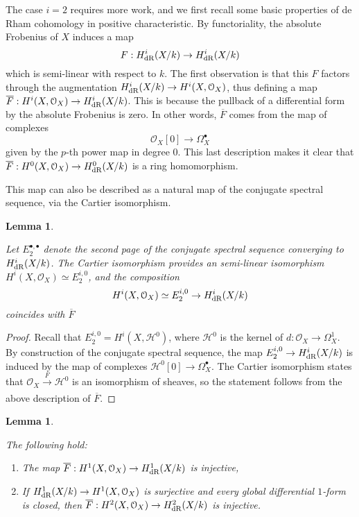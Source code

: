 \documentclass[11pt]{article}
\theoremstyle{plain}
\newtheorem{Lem}[Thm]{Lemma}
\theoremstyle{definition}
\theoremstyle{remark}
\numberwithin{equation}{section}
\newenvironment{lemma}[1]%
    { \begin{Lem} \label{L:#1}}%
    { \end{Lem} }
\newcommand{\lem}[1]{\begin{lemma}{#1} \sl}
\newcommand{\elem}{\end{lemma}}
\newcommand{\prf}{ \begin{proof} }
\newcommand{\epr}{ \end{proof} }
\newcommand\calO{\mathcal{O}}
\newcommand\xto[2]{\xrightarrow[#1]{#2}}
\newcommand\HdR[1]{H^{#1}_{\textnormal{dR}}}                             %
\begin{document}
The case $i=2$ requires more work, and we first recall some basic properties of de Rham cohomology in positive characteristic. By functoriality, the absolute Frobenius of $X$ induces a map
\[
F:\HdR{i}(X/k)\to\HdR{i}(X/k)
\]
which is semi-linear with respect to $k$. The first observation is that this $F$ factors through the augmentation $\HdR{i}(X/k)\to H^{i}(X,\calO_X)$, thus defining a map $\overline{F}:H^{i}(X,\calO_X)\to\HdR{i}(X/k)$. This is because the pullback of a differential form by the absolute Frobenius is zero. In other words, $\overline{F}$ comes from the map of complexes
\[
\calO_X[0]\to\Omega^{\bullet}_{X}
\]
given by the $p$-th power map in degree $0$. This last description makes it clear that $\overline{F}:H^0(X,\calO_X)\to\HdR{0}(X/k)$ is a ring homomorphism.

This map can also be described as a natural map of the conjugate spectral sequence, via the Cartier isomorphism. 

\lem{bordoconiugata}

Let $E_2^{\bullet,\bullet}$ denote the second page of the conjugate spectral sequence converging to $\HdR{i}(X/k)$. The Cartier isomorphism provides an semi-linear isomorphism $H^i(X,\calO_X)\simeq E_2^{i,0}$, and the composition
\begin{equation}\label{ultimaeq}
H^i(X,\calO_X)\simeq E_2^{i,0}\to\HdR{i}(X/k)
\end{equation}
coincides with $\overline{F}$
\elem

\prf

Recall that $E^{i,0}_2=H^i(X,\mathcal{H}^0)$, where $\mathcal{H}^0$ is the kernel of $d:\calO_X\to\Omega^1_X$. By construction of the conjugate spectral sequence, the map $E^{i,0}_2\to\HdR{i}(X/k)$ is induced by the map of complexes $\mathcal{H}^0[0]\to\Omega^{\bullet}_{X}$. The Cartier isomorphism states that $\calO_X\xto{}{F}\mathcal{H}^0$ is an isomorphism of sheaves, so the statement follows from the above description of $\overline{F}$. \epr
\lem{comportamentofbar}

The following hold:
\begin{enumerate}
    \item The map $\overline{F}:H^{1}(X,\calO_X)\to\HdR{1}(X/k)$ is injective,
    \item If $\HdR{1}(X/k)\to H^1(X,\calO_X)$ is surjective and every global differential $1$-form is closed, then $\overline{F}:H^{2}(X,\calO_X)\to\HdR{2}(X/k)$ is injective.
\end{enumerate}
\elem
\end{document}
